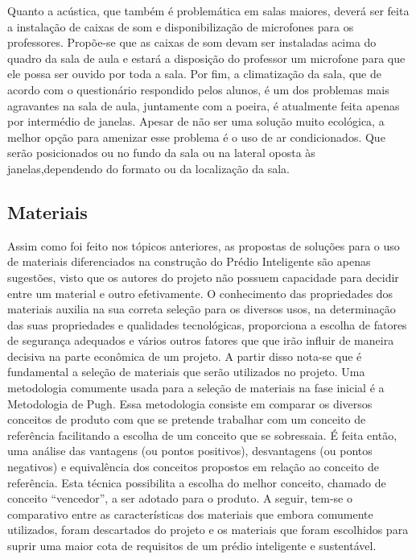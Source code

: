 Quanto a acústica, que também é problemática em salas maiores, deverá ser feita a instalação de caixas de som e disponibilização de microfones para os professores. Propõe-se que as caixas de som devam ser instaladas acima do quadro da sala de aula e estará a disposição do professor um microfone para que ele possa ser ouvido por toda a sala.
Por fim, a climatização da sala, que de acordo com o questionário respondido pelos alunos, é um dos problemas mais agravantes na sala de aula, juntamente com a poeira, é atualmente feita apenas por intermédio de janelas. Apesar de não ser uma solução muito ecológica, a melhor opção para amenizar esse problema é o uso de ar condicionados. Que serão posicionados ou no fundo da sala ou na lateral oposta às janelas,dependendo do formato ou da localização da sala.

\subsection{Materiais}

Assim como foi feito nos tópicos anteriores, as propostas de soluções para o uso de materiais diferenciados na construção do Prédio Inteligente são apenas sugestões, visto que os autores do projeto não possuem capacidade para decidir entre um material e outro efetivamente.
O conhecimento das propriedades dos materiais auxilia na sua correta seleção para os diversos usos, na determinação das suas propriedades e qualidades tecnológicas, proporciona a escolha de fatores de segurança adequados e vários outros fatores que que irão influir de maneira decisiva na parte econômica de um projeto.
A partir disso nota-se que é fundamental a seleção de materiais que serão utilizados no projeto. Uma metodologia comumente usada para a seleção de materiais na fase inicial é a Metodologia de Pugh. Essa metodologia consiste em comparar os diversos conceitos de produto com que se pretende trabalhar com um conceito de referência facilitando a escolha de um conceito que se sobressaia.
É feita então, uma análise das vantagens (ou pontos positivos), desvantagens (ou pontos negativos) e equivalência dos conceitos propostos em relação ao conceito de referência. Esta técnica possibilita a escolha do melhor conceito, chamado de conceito “vencedor”, a ser adotado para o produto.
A seguir, tem-se o comparativo entre as características dos materiais que embora comumente utilizados, foram descartados do projeto e os materiais que foram escolhidos para suprir uma maior cota de requisitos de um prédio inteligente e sustentável.

